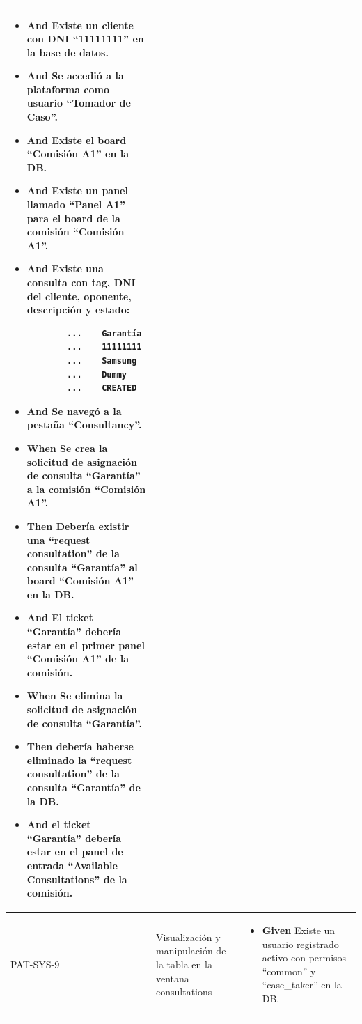\begin{longtable}{|p{1cm}|p{2.5cm}|p{12cm}|}
\begin{itemize}
        \item \textbf{And} Existe un cliente con DNI ``11111111'' en la base de datos.
        \item \textbf{And} Se accedió a la plataforma como usuario ``Tomador de Caso''.
        \item \textbf{And} Existe el board ``Comisión A1'' en la DB.
        \item \textbf{And} Existe un panel llamado ``Panel A1'' para el board de la comisión ``Comisión A1''.
        \item \textbf{And} Existe una consulta con tag, DNI del cliente, oponente, descripción y estado:
        \begin{verbatim}
        ...    Garantía
        ...    11111111
        ...    Samsung
        ...    Dummy
        ...    CREATED
        \end{verbatim}
        \item \textbf{And} Se navegó a la pestaña ``Consultancy''.
        \newline
        \item \textbf{When} Se crea la solicitud de asignación de consulta ``Garant\'ia'' a la comisión ``Comisión A1''.
        \newline
        \item \textbf{Then} Debería existir una ``request consultation'' de la consulta ``Garant\'ia'' al board ``Comisión A1'' en la DB.
        \item \textbf{And} El ticket ``Garant\'ia'' deber\'ia estar en el primer panel ``Comisión A1'' de la comisión.
        \newline
        \item \textbf{When} Se elimina la solicitud de asignación de consulta ``Garant\'ia''.
        \newline
        \item \textbf{Then} debería haberse eliminado la ``request consultation'' de la consulta ``Garant\'ia'' de la DB.
        \item \textbf{And} el ticket ``Garant\'ia'' debería estar en el panel de entrada ``Available Consultations'' de la comisión.
    \end{itemize}
    \\
    \hline
     PAT-SYS-9 & Visualización y manipulación de la tabla en la ventana consultations &
    \begin{itemize}
        \item \textbf{Given} Existe un usuario registrado activo con permisos ``common'' y ``case\_taker'' en la DB.

\end{itemize}
\end{longtable}
